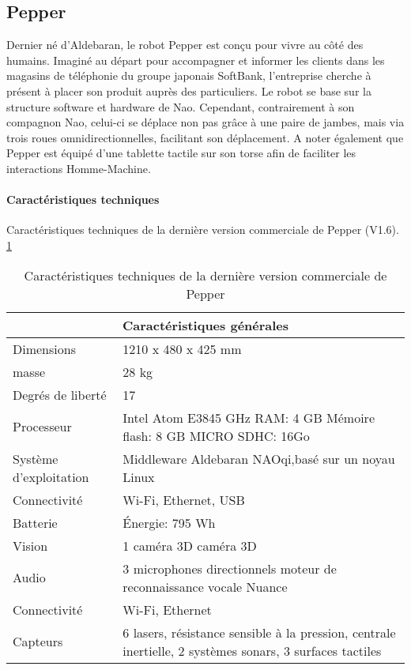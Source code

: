 \subsection{Pepper}
\label{Entreprise: Les produits: Pepper}
Dernier né d'Aldebaran, le robot Pepper est conçu pour vivre au côté des humains. Imaginé au départ pour accompagner et informer les clients dans les magasins de téléphonie du groupe japonais SoftBank, l'entreprise cherche à présent à placer son produit auprès des particuliers. Le robot se base sur la structure software et hardware de Nao. Cependant, contrairement à son compagnon Nao, celui-ci se déplace non pas grâce à une paire de jambes, mais via trois roues omnidirectionnelles, facilitant son déplacement. A noter également que Pepper est équipé d'une tablette tactile sur son torse afin de faciliter les interactions Homme-Machine.

\paragraph{Caractéristiques techniques}
Caractéristiques techniques de la dernière version commerciale de Pepper (V1.6). \ref{tab: Caractéristiques technique de Pepper}

\begin{table}[h]
\begin{tabular}{ | l | p{8cm} | }
	\hline
	\multicolumn{2}{|c|}{Caractéristiques générales} \\
	\hline
	Dimensions & 1210 x 480 x 425 mm \\
	\hline 
	masse & 28 kg \\
	\hline 
	Degrés de liberté  & 17 \\
	\hline
	Processeur & Intel Atom E3845 \newline 1.91 GHz \newline RAM: 4 GB \newline Mémoire flash: 8 GB \newline MICRO SDHC: 16Go  \\
	\hline
	Système d'exploitation & Middleware Aldebaran NAOqi,\newline basé sur un noyau Linux \\
	\hline
	Connectivité & Wi-Fi, Ethernet, USB \\
	\hline
	Batterie & Énergie: 795 Wh \\
	\hline 
	Vision & 1 caméra 3D \newline 1 caméra 3D \\
	\hline
	Audio & 3 microphones directionnels \newline moteur de reconnaissance vocale Nuance  \\
	\hline
	Connectivité & Wi-Fi, Ethernet \\
	\hline
	Capteurs & 6 lasers, résistance sensible à la pression, centrale inertielle, 2 systèmes sonars, 3 surfaces tactiles \\
	\hline
\end{tabular}
\caption[Caractéristiques technique de Pepper]{Caractéristiques techniques de la dernière version commerciale  de Pepper}
\label {tab: Caractéristiques technique de Pepper}
\end{table}


